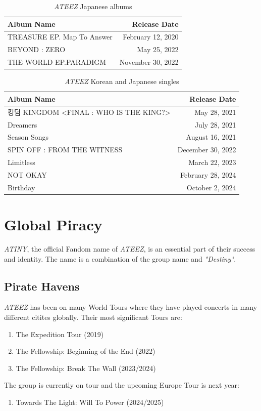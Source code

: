 \documentclass[a4paper,12pt]{article}
\begin{document}
\begin{table}[H]
\begin{tabularx}{\textwidth}{|X|r|}
    \hline
    Album Name & Release Date\\
    \hline
    TREASURE EP. Map To Answer & February 12, 2020\\
    \hline
    BEYOND : ZERO &  May 25, 2022\\
    \hline
    THE WORLD EP.PARADIGM &  November 30, 2022\\
    \hline
\end{tabularx}
\caption{\textit{ATEEZ} Japanese albums}
\end{table}

\begin{table}[H]
\begin{tabularx}{\textwidth}{|X|r|}
    \hline
    Album Name & Release Date\\
    \hline
    킹덤 KINGDOM <FINAL : WHO IS THE KING?> & May 28, 2021\\
    \hline
    Dreamers &  July 28, 2021\\
    \hline
    Season Songs &  August 16, 2021\\
    \hline
    SPIN OFF : FROM THE WITNESS & December 30, 2022\\
    \hline
    Limitless & March 22, 2023\\
    \hline
    NOT OKAY & February 28, 2024\\
    \hline
    Birthday & October 2, 2024\\
    \hline
\end{tabularx}
\caption{\textit{ATEEZ} Korean and Japanese singles}
\end{table}


\newpage
\section{Global Piracy}\label{sec:atiny}
\textit{ATINY}, the official Fandom name of \textit{ATEEZ}, is an essential part of their success and identity. The name is a combination of the group name and \textit{"Destiny"}.

\subsection{Pirate Havens}
\textit{ATEEZ} has been on many World Tours where they have played concerts in many different citites globally. Their most significant Tours are:\\
\begin{enumerate}
    \item The Expedition Tour (2019)
    \item The Fellowship: Beginning of the End (2022)
    \item The Fellowship: Break The Wall (2023/2024)
\end{enumerate}
The group is currently on tour and the upcoming Europe Tour is next year:\\
\begin{enumerate}[start=4]
    \item Towards The Light: Will To Power (2024/2025)
\end{enumerate}
\end{document}

